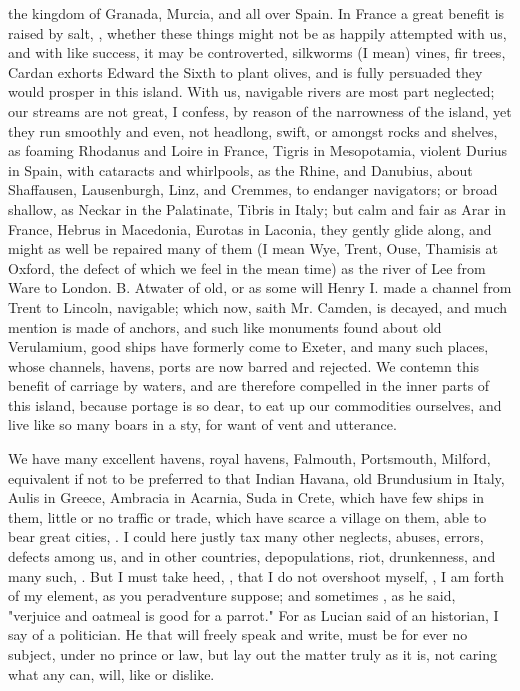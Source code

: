 the kingdom of Granada, Murcia, and all over Spain. In France a great benefit
is raised by salt, \etc{}, whether these things might not be as happily
attempted with us, and with like success, it may be controverted, silkworms (I
mean) vines, fir trees, \etc{} Cardan exhorts Edward the Sixth to plant olives,
and is fully persuaded they would prosper in this island. With us, navigable
rivers are most part neglected; our streams are not great, I confess, by reason
of the narrowness of the island, yet they run smoothly and even, not headlong,
swift, or amongst rocks and shelves, as foaming Rhodanus and Loire in France,
Tigris in Mesopotamia, violent Durius in Spain, with cataracts and whirlpools,
as the Rhine, and Danubius, about Shaffausen, Lausenburgh, Linz, and Cremmes,
to endanger navigators; or broad shallow, as Neckar in the Palatinate, Tibris
in Italy; but calm and fair as Arar in France, Hebrus in Macedonia, Eurotas in
Laconia, they gently glide along, and might as well be repaired many of them (I
mean Wye, Trent, Ouse, Thamisis at Oxford, the defect of which we feel in the
mean time) as the river of Lee from Ware to London. B. Atwater of old, or as
some will Henry I. made a channel from Trent to Lincoln,
navigable; which now, saith Mr. Camden, is decayed, and much mention is made of
anchors, and such like monuments found about old
Verulamium, good ships have formerly come to Exeter, and
many such places, whose channels, havens, ports are now barred and rejected. We
contemn this benefit of carriage by waters, and are therefore compelled in the
inner parts of this island, because portage is so dear, to eat up our
commodities ourselves, and live like so many boars in a sty, for want of vent
and utterance.

We have many excellent havens, royal havens, Falmouth, Portsmouth, Milford,
\etc{} equivalent if not to be preferred to that Indian Havana, old Brundusium
in Italy, Aulis in Greece, Ambracia in Acarnia, Suda in Crete, which have few
ships in them, little or no traffic or trade, which have scarce a village on
them, able to bear great cities, . I could here
justly tax many other neglects, abuses, errors, defects among us, and in other
countries, depopulations, riot, drunkenness, \etc{} and many such, . But I must take heed, , that I do not overshoot myself, , I am forth of my
element, as you peradventure suppose; and sometimes ,
as he said, "verjuice and oatmeal is good for a parrot." For as Lucian said of
an historian, I say of a politician. He that will freely speak and write, must
be for ever no subject, under no prince or law, but lay out the matter truly as
it is, not caring what any can, will, like or dislike.

